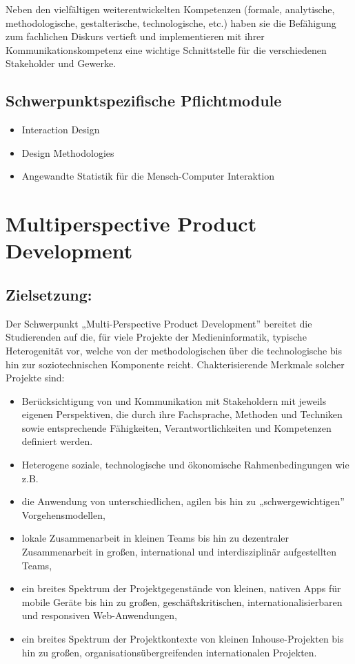 Neben den vielfältigen weiterentwickelten Kompetenzen (formale,
analytische, methodologische, gestalterische, technologische, etc.)
haben sie die Befähigung zum fachlichen Diskurs vertieft und
implementieren mit ihrer Kommunikationskompetenz eine wichtige
Schnittstelle für die verschiedenen Stakeholder und Gewerke.

\section*{Schwerpunktspezifische
Pflichtmodule}\label{schwerpunktspezifische-pflichtmodule}

\begin{itemize}
\tightlist
\item
  Interaction Design
\item
  Design Methodologies
\item
  Angewandte Statistik für die Mensch-Computer Interaktion
\end{itemize}

\chapter{Multiperspective Product
Development}\label{multiperspective-product-development}

\section*{Zielsetzung:}\label{zielsetzung}

Der Schwerpunkt „Multi-Perspective Product Development'' bereitet die
Studierenden auf die, für viele Projekte der Medieninformatik, typische
Heterogenität vor, welche von der methodologischen über die
technologische bis hin zur soziotechnischen Komponente reicht.
Chakterisierende Merkmale solcher Projekte sind:

\begin{itemize}
\tightlist
\item
  Berücksichtigung von und Kommunikation mit Stakeholdern mit jeweils
  eigenen Perspektiven, die durch ihre Fachsprache, Methoden und
  Techniken sowie entsprechende Fähigkeiten, Verantwortlichkeiten und
  Kompetenzen definiert werden.
\item
  Heterogene soziale, technologische und ökonomische Rahmenbedingungen
  wie z.B.
\item
  die Anwendung von unterschiedlichen, agilen bis hin zu
  „schwergewichtigen'' Vorgehensmodellen,
\item
  lokale Zusammenarbeit in kleinen Teams bis hin zu dezentraler
  Zusammenarbeit in großen, international und interdisziplinär
  aufgestellten Teams,
\item
  ein breites Spektrum der Projektgegenstände von kleinen, nativen Apps
  für mobile Geräte bis hin zu großen, geschäftskritischen,
  internationalisierbaren und responsiven Web-Anwendungen,
\item
  ein breites Spektrum der Projektkontexte von kleinen Inhouse-Projekten
  bis hin zu großen, organisationsübergreifenden internationalen
  Projekten.
\end{itemize}

